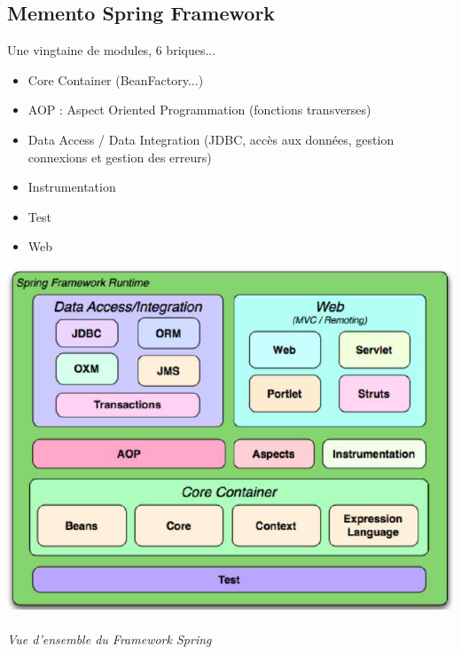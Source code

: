 \documentclass[11pt,twoside,a4paper]{article}
\begin{document}
\begin{landscape}


\setlength\parindent{0cm} %


\begin{multicols}{2}
	\section*{Memento Spring Framework}
	
	Une vingtaine de modules, 6 briques...
	\begin{itemize}
		\item Core Container (BeanFactory...)
		\item AOP : Aspect Oriented Programmation (fonctions transverses)
		\item Data Access / Data Integration (JDBC, acc{\`e}s aux donn{\'e}es, gestion connexions et gestion des erreurs)
		\item Instrumentation
		\item Test
		\item Web
	\end{itemize} %
	
	\includegraphics[width=0.95\linewidth]{./SpringFrameworkRuntime.png}~\\
	\emph{\footnotesize Vue d'ensemble du Framework Spring}
	

\end{multicols}
\end{landscape}
\end{document}

